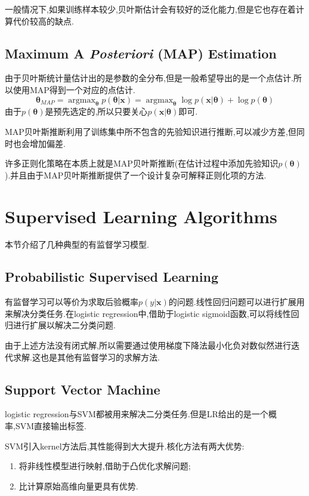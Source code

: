 一般情况下,如果训练样本较少,贝叶斯估计会有较好的泛化能力,但是它也存在着计算代价较高的缺点.

\subsection{Maximum A \textit{Posteriori} (MAP) Estimation}

由于贝叶斯统计量估计出的是参数的全分布,但是一般希望导出的是一个点估计.所以使用MAP得到一个对应的点估计.
\begin{equation}\label{eq:map_estimation}
{\bm\theta}_{MAP}=\mathop{\arg\max}_{\bm\theta} p({\bm\theta}|\bm x)=\mathop{\arg\max}_{\bm\theta}\log p(\bm x|{\bm\theta})+\log p({\bm\theta})
\end{equation}
由于$p({\bm\theta})$是预先选定的,所以只要关心$p(\bm x|{\bm\theta})$即可.

MAP贝叶斯推断利用了训练集中所不包含的先验知识进行推断,可以减少方差,但同时也会增加偏差.

许多正则化策略在本质上就是MAP贝叶斯推断(在估计过程中添加先验知识$p({\bm\theta})$).并且由于MAP贝叶斯推断提供了一个设计复杂可解释正则化项的方法.

\section{Supervised Learning Algorithms}

本节介绍了几种典型的有监督学习模型.

\subsection{Probabilistic Supervised Learning}

有监督学习可以等价为求取后验概率$p(y|\bm x)$的问题.线性回归问题可以进行扩展用来解决分类任务.在logistic regression中,借助于logistic sigmoid函数,可以将线性回归进行扩展以解决二分类问题.

由于上述方法没有闭式解,所以需要通过使用梯度下降法最小化负对数似然进行迭代求解.这也是其他有监督学习的求解方法.

\subsection{Support Vector Machine}

logistic regression与SVM都被用来解决二分类任务.但是LR给出的是一个概率,SVM直接输出标签.

SVM引入kernel方法后,其性能得到大大提升.核化方法有两大优势:
\begin{enumerate}
\item 将非线性模型进行映射,借助于凸优化求解问题;
\item 比计算原始高维向量更具有优势.
\end{enumerate}

